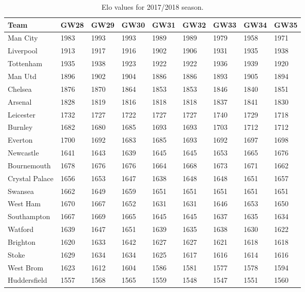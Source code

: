 \begin{table}[H]
\centering
\smaller
\caption{Elo values for 2017/2018 season.}
\label{my-label}
\begin{tabular}{|l|l|l|l|l|l|l|l|l|}
\hline
Team           & GW28 & GW29 & GW30 & GW31 & GW32 & GW33 & GW34 & GW35 \\
\hline
Man City       & 1983 & 1993 & 1993 & 1989 & 1989 & 1979 & 1958 & 1971 \\
Liverpool      & 1913 & 1917 & 1916 & 1902 & 1906 & 1931 & 1935 & 1938 \\
Tottenham      & 1935 & 1938 & 1923 & 1922 & 1922 & 1936 & 1939 & 1920 \\
Man Utd        & 1896 & 1902 & 1904 & 1886 & 1886 & 1893 & 1905 & 1894 \\
Chelsea        & 1876 & 1870 & 1864 & 1853 & 1853 & 1846 & 1840 & 1851 \\
Arsenal        & 1828 & 1819 & 1816 & 1818 & 1818 & 1837 & 1841 & 1830 \\
Leicester      & 1732 & 1727 & 1722 & 1727 & 1727 & 1740 & 1729 & 1718 \\
Burnley        & 1682 & 1680 & 1685 & 1693 & 1693 & 1703 & 1712 & 1712 \\
Everton        & 1700 & 1692 & 1683 & 1685 & 1693 & 1692 & 1697 & 1698 \\
Newcastle      & 1641 & 1643 & 1639 & 1645 & 1645 & 1653 & 1665 & 1676 \\
Bournemouth    & 1678 & 1676 & 1676 & 1664 & 1668 & 1673 & 1671 & 1662 \\
Crystal Palace & 1656 & 1653 & 1647 & 1638 & 1648 & 1648 & 1651 & 1657 \\
Swansea        & 1662 & 1649 & 1659 & 1651 & 1651 & 1651 & 1651 & 1651 \\
West Ham       & 1670 & 1667 & 1652 & 1631 & 1631 & 1646 & 1653 & 1650 \\
Southampton    & 1667 & 1669 & 1665 & 1645 & 1645 & 1637 & 1635 & 1634 \\
Watford        & 1639 & 1647 & 1651 & 1639 & 1635 & 1638 & 1630 & 1622 \\
Brighton       & 1620 & 1633 & 1642 & 1627 & 1627 & 1621 & 1618 & 1618 \\
Stoke          & 1629 & 1634 & 1634 & 1625 & 1617 & 1616 & 1614 & 1616 \\
West Brom      & 1623 & 1612 & 1604 & 1586 & 1581 & 1577 & 1578 & 1594 \\
Huddersfield   & 1557 & 1568 & 1565 & 1559 & 1548 & 1547 & 1551 & 1560 \\
\hline
\end{tabular}
\end{table}